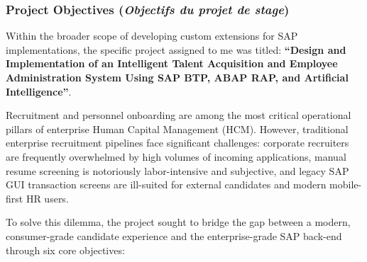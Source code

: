 \subsubsection{Project Objectives (\textit{Objectifs du projet de stage})}
\label{subsubsec:project_objectives}

Within the broader scope of developing custom extensions for SAP implementations, the specific project assigned to me was titled: \textbf{``Design and Implementation of an Intelligent Talent Acquisition and Employee Administration System Using SAP BTP, ABAP RAP, and Artificial Intelligence''}. 

Recruitment and personnel onboarding are among the most critical operational pillars of enterprise Human Capital Management (HCM). However, traditional enterprise recruitment pipelines face significant challenges: corporate recruiters are frequently overwhelmed by high volumes of incoming applications, manual resume screening is notoriously labor-intensive and subjective, and legacy SAP GUI transaction screens are ill-suited for external candidates and modern mobile-first HR users.

To solve this dilemma, the project sought to bridge the gap between a modern, consumer-grade candidate experience and the enterprise-grade SAP back-end through six core objectives:

